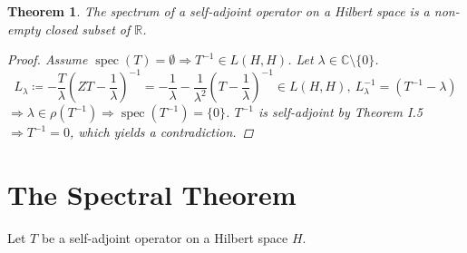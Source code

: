 \documentclass[12pt]{extreport} %
\newcommand{\C}{\mathbb{C}}
\newcommand{\R}{\mathbb{R}}
\theoremstyle{named}
\theoremstyle{nnamed}
\theoremstyle{itshape}
\newtheorem{theorem}{Theorem}  \counterwithin{theorem}{chapter}
\theoremstyle{normal}
\begin{document}
\begin{theorem}
	The spectrum of a self-adjoint operator on a Hilbert space is a non-empty closed subset of $\R$.
	
	\begin{proof}
		Assume $\operatorname{spec}(T) = \emptyset \Rightarrow T^{-1} \in L(H, H)$. Let $\lambda \in \C \setminus \{ 0 \}$.
		$$ L_{\lambda} \coloneqq - \frac{T}{\lambda} \left( ZT - \frac{1}{\lambda} \right)^{-1} = - \frac{1}{\lambda} - \frac{1}{\lambda^2} \left( T - \frac{1}{\lambda} \right)^{-1} \in L(H, H), ~ L_{\lambda}^{-1} = \left( T^{-1} - \lambda \right) $$
		$\Rightarrow \lambda \in \rho(T^{-1}) \Rightarrow \operatorname{spec}(T^{-1}) = \{ 0 \}$. $T^{-1}$ is self-adjoint by Theorem I.5 $\Rightarrow T^{-1} = 0$, which yields a contradiction.
	\end{proof}
\end{theorem}

\chapter{The Spectral Theorem}

Let $T$ be a self-adjoint operator on a Hilbert space $H$.
\end{document}
